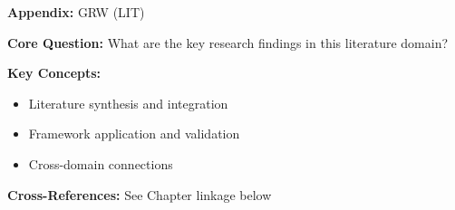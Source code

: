 
\begin{tcolorbox}[colback=blue!5!white, colframe=blue!75!black,
    title=Quick Reference: Appendix GRW]
\textbf{Appendix:} GRW (LIT)

\textbf{Core Question:} What are the key research findings in this literature domain?

\textbf{Key Concepts:}
\begin{itemize}[nosep]
\item Literature synthesis and integration
\item Framework application and validation
\item Cross-domain connections
\end{itemize}

\textbf{Cross-References:} See Chapter linkage below
\end{tcolorbox}


\begin{abstract}
This appendix provides a systematic review and integration of key research findings
in the LIT domain. It synthesizes literature relevant to the Evidence-Based
Framework (EBF) and identifies connections to the 10C CORE architecture.
\end{abstract}


